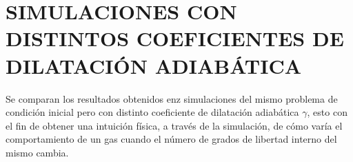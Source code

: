 \chapter{SIMULACIONES CON DISTINTOS COEFICIENTES DE DILATACIÓN ADIABÁTICA}
Se comparan los resultados obtenidos enz simulaciones del mismo problema de condición inicial pero con distinto coeficiente de dilatación adiabática $\gamma$, esto con el fin de obtener una intuición física, a través de la simulación, de cómo varía el comportamiento de un gas cuando el número de grados de libertad interno del mismo cambia.